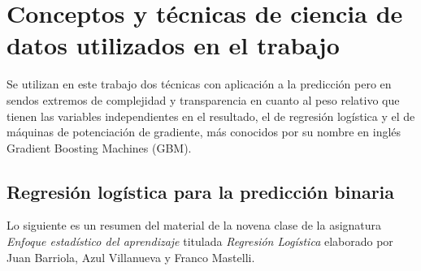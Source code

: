 \documentclass[a4paper]{report}
\begin{document}





\section{Conceptos y técnicas de ciencia de datos utilizados en el trabajo}


Se utilizan en este trabajo dos técnicas con aplicación a la predicción pero en sendos extremos de complejidad y transparencia en cuanto al peso relativo que tienen las variables independientes en el resultado, el de regresión logística y el de máquinas de potenciación de gradiente, más conocidos por su nombre en inglés Gradient Boosting Machines (GBM).


\subsection{Regresión logística para la predicción binaria}

Lo siguiente es un resumen del material de la novena clase de la asignatura \emph{Enfoque estadístico del aprendizaje} titulada \emph{Regresión Logística} elaborado por Juan Barriola, Azul Villanueva y Franco Mastelli. 
\end{document}

